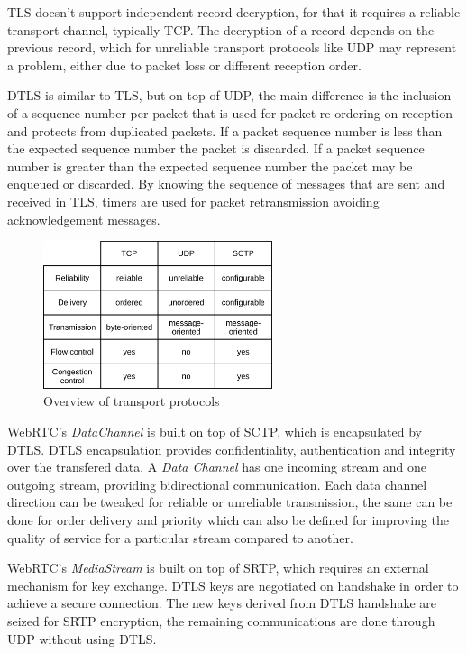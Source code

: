 \ac{TLS} doesn't support independent record decryption, for that it requires a reliable transport channel, typically \ac{TCP}. The decryption of a record depends on the previous record, which for unreliable transport protocols like \ac{UDP} may represent a problem, either due to packet loss or different reception order.

\ac{DTLS} is similar to \ac{TLS}, but on top of \ac{UDP}, the main difference is the inclusion of a sequence number per packet that is used for packet re-ordering on reception and protects from duplicated packets. If a packet sequence number is less than the expected sequence number the packet is discarded. If a packet sequence number is greater than the expected sequence number the packet may be enqueued or discarded. By knowing the sequence of messages that are sent and received in \ac{TLS}, timers are used for packet retransmission avoiding acknowledgement messages.

\begin{figure}[H]
	\begin{center}
		\centering
		\includegraphics[width=0.6\textwidth]{figures/basic_protocols.png}

	\caption{Overview of transport protocols}
	\end{center}
\end{figure}

\ac{WebRTC}'s \textit{DataChannel} is built on top of \ac{SCTP}, which is encapsulated by \ac{DTLS}. \ac{DTLS} encapsulation provides confidentiality, authentication and integrity over the transfered data. A \textit{Data Channel} has one incoming stream and one outgoing stream, providing bidirectional communication. Each data channel direction can be tweaked for reliable or unreliable transmission, the same can be done for order delivery and priority which can also be defined for improving the quality of service for a particular stream compared to another.

\ac{WebRTC}'s \textit{MediaStream} is built on top of \ac{SRTP}, which requires an external mechanism for key exchange. \ac{DTLS} keys are negotiated on handshake in order to achieve a secure connection. The new keys derived from \ac{DTLS} handshake are seized for \ac{SRTP} encryption, the remaining communications are done through \ac{UDP} without using \ac{DTLS}.

